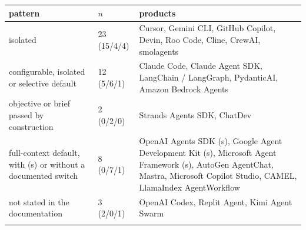 \begin{tabular*}{\textwidth}{@{\extracolsep\fill}p{}p{}p{}@{}}
\toprule
pattern & $n$ & products \\
\midrule
isolated & 23 (15/4/4) & Cursor, Gemini CLI, GitHub Copilot, Devin, Roo Code, Cline, CrewAI, smolagents \\
configurable, isolated or selective default & 12 (5/6/1) & Claude Code, Claude Agent SDK, LangChain / LangGraph, PydanticAI, Amazon Bedrock Agents \\
objective or brief passed by construction & 2 (0/2/0) & Strands Agents SDK, ChatDev \\
full-context default, with (s) or without a documented switch & 8 (0/7/1) & OpenAI Agents SDK (s), Google Agent Development Kit (s), Microsoft Agent Framework (s), AutoGen AgentChat, Mastra, Microsoft Copilot Studio, CAMEL, LlamaIndex AgentWorkflow \\
not stated in the documentation & 3 (2/0/1) & OpenAI Codex, Replit Agent, Kimi Agent Swarm \\
\botrule
\end{tabular*}
